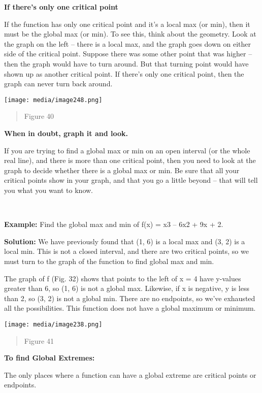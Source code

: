 \textbf{If there's only one critical point}

If the function has only one critical point and it's a local max (or
min), then it must be the global max (or min). To see this, think about
the geometry. Look at the graph on the left -- there is a local max, and
the graph goes down on either side of the critical point. Suppose there
was some other point that was higher -- then the graph would have to
turn around. But that turning point would have shown up as another
critical point. If there's only one critical point, then the graph can
never turn back around.

\texttt{[image: media/image248.png]}

\begin{quote}
Figure 40
\end{quote}

\textbf{When in doubt, graph it and look.}

If you are trying to find a global max or min on an open interval (or
the whole real line), and there is more than one critical point, then
you need to look at the graph to decide whether there is a global max or
min. Be sure that all your critical points show in your graph, and that
you go a little beyond -- that will tell you what you want to know.

\textbf{\\
}

\textbf{Example:} Find the global max and min of f(x) = x3 -- 6x2 + 9x +
2.

\textbf{Solution:} We have previously found that (1, 6) is a local max
and (3, 2) is a local min. This is not a closed interval, and there are
two critical points, so we must turn to the graph of the function to
find global max and min.

The graph of f (Fig. 32) shows that points to the left of x = 4 have
y-values greater than 6, so (1, 6) is not a global max. Likewise, if x
is negative, y is less than 2, so (3, 2) is not a global min. There are
no endpoints, so we've exhausted all the possibilities. This function
does not have a global maximum or minimum.

\texttt{[image: media/image238.png]}

\begin{quote}
Figure 41
\end{quote}

\textbf{To find Global Extremes:}

The only places where a function can have a global extreme are critical
points or endpoints.


